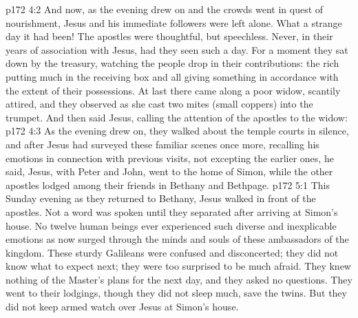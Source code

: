 \vs p172 4:2 And now, as the evening drew on and the crowds went in quest of nourishment, Jesus and his immediate followers were left alone. What a strange day it had been! The apostles were thoughtful, but speechless. Never, in their years of association with Jesus, had they seen such a day. For a moment they sat down by the treasury, watching the people drop in their contributions: the rich putting much in the receiving box and all giving something in accordance with the extent of their possessions. At last there came along a poor widow, scantily attired, and they observed as she cast two mites (small coppers) into the trumpet. And then said Jesus, calling the attention of the apostles to the widow: 
\vs p172 4:3 As the evening drew on, they walked about the temple courts in silence, and after Jesus had surveyed these familiar scenes once more, recalling his emotions in connection with previous visits, not excepting the earlier ones, he said,  Jesus, with Peter and John, went to the home of Simon, while the other apostles lodged among their friends in Bethany and Bethpage.
\vs p172 5:1 This Sunday evening as they returned to Bethany, Jesus walked in front of the apostles. Not a word was spoken until they separated after arriving at Simon’s house. No twelve human beings ever experienced such diverse and inexplicable emotions as now surged through the minds and souls of these ambassadors of the kingdom. These sturdy Galileans were confused and disconcerted; they did not know what to expect next; they were too surprised to be much afraid. They knew nothing of the Master’s plans for the next day, and they asked no questions. They went to their lodgings, though they did not sleep much, save the twins. But they did not keep armed watch over Jesus at Simon’s house.
